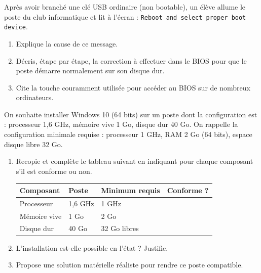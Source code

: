 \documentclass[11pt]{article}
\newcounter{popsec}
\newcounter{popsub}
\newcommand{\courssub}[1]{%
  \stepcounter{popsub}%
  \par\vspace{9pt}\noindent{\popxbold\fontsize{11.5}{13}\selectfont\color{popink}{\color{poporange}\thepopsec.\thepopsub}\hspace{6pt}#1}\par\nopagebreak\vspace{4pt}
}
\begin{document}
\courssub{Je m'entraîne}

\begin{exercice}
Après avoir branché une clé USB ordinaire (non bootable), un élève allume le poste du club informatique et lit à l'écran : \texttt{Reboot and select proper boot device}.
\begin{enumerate}
\item Explique la cause de ce message.
\item Décris, étape par étape, la correction à effectuer dans le BIOS pour que le poste démarre normalement sur son disque dur.
\item Cite la touche couramment utilisée pour accéder au BIOS sur de nombreux ordinateurs.
\end{enumerate}
\end{exercice}

\begin{exercice}
On souhaite installer Windows 10 (64 bits) sur un poste dont la configuration est : processeur 1,6 GHz, mémoire vive 1 Go, disque dur 40 Go. On rappelle la configuration minimale requise : processeur 1 GHz, RAM 2 Go (64 bits), espace disque libre 32 Go.
\begin{enumerate}
\item Recopie et complète le tableau suivant en indiquant pour chaque composant s'il est conforme ou non.
\begin{center}
\begin{tabularx}{\linewidth}{|l|X|X|X|}
\hline
\rowcolor{popblueL} \textbf{Composant} & \textbf{Poste} & \textbf{Minimum requis} & \textbf{Conforme ?} \\
\hline
Processeur & 1,6 GHz & 1 GHz & \\
\hline
Mémoire vive & 1 Go & 2 Go & \\
\hline
Disque dur & 40 Go & 32 Go libres & \\
\hline
\end{tabularx}
\end{center}
\item L'installation est-elle possible en l'état ? Justifie.
\item Propose une solution matérielle réaliste pour rendre ce poste compatible.
\end{enumerate}
\end{exercice}
\end{document}
